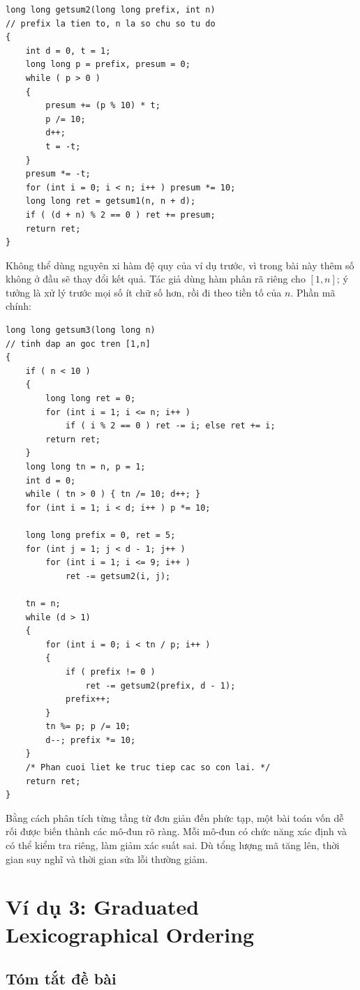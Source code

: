 \documentclass[11pt]{article}
\begin{document}
\begin{verbatim}
long long getsum2(long long prefix, int n)
// prefix la tien to, n la so chu so tu do
{
    int d = 0, t = 1;
    long long p = prefix, presum = 0;
    while ( p > 0 )
    {
        presum += (p % 10) * t;
        p /= 10;
        d++;
        t = -t;
    }
    presum *= -t;
    for (int i = 0; i < n; i++ ) presum *= 10;
    long long ret = getsum1(n, n + d);
    if ( (d + n) % 2 == 0 ) ret += presum;
    return ret;
}
\end{verbatim}

Không thể dùng nguyên xi hàm đệ quy của ví dụ trước, vì trong bài này thêm số
không ở đầu sẽ thay đổi kết quả. Tác giả dùng hàm phân rã riêng cho \([1,n]\);
ý tưởng là xử lý trước mọi số ít chữ số hơn, rồi đi theo tiền tố của \(n\).
Phần mã chính:

\begin{verbatim}
long long getsum3(long long n)
// tinh dap an goc tren [1,n]
{
    if ( n < 10 )
    {
        long long ret = 0;
        for (int i = 1; i <= n; i++ )
            if ( i % 2 == 0 ) ret -= i; else ret += i;
        return ret;
    }
    long long tn = n, p = 1;
    int d = 0;
    while ( tn > 0 ) { tn /= 10; d++; }
    for (int i = 1; i < d; i++ ) p *= 10;

    long long prefix = 0, ret = 5;
    for (int j = 1; j < d - 1; j++ )
        for (int i = 1; i <= 9; i++ )
            ret -= getsum2(i, j);

    tn = n;
    while (d > 1)
    {
        for (int i = 0; i < tn / p; i++ )
        {
            if ( prefix != 0 )
                ret -= getsum2(prefix, d - 1);
            prefix++;
        }
        tn %= p; p /= 10;
        d--; prefix *= 10;
    }
    /* Phan cuoi liet ke truc tiep cac so con lai. */
    return ret;
}
\end{verbatim}

Bằng cách phân tích từng tầng từ đơn giản đến phức tạp, một bài toán vốn dễ
rối được biến thành các mô-đun rõ ràng. Mỗi mô-đun có chức năng xác định và có
thể kiểm tra riêng, làm giảm xác suất sai. Dù tổng lượng mã tăng lên, thời gian
suy nghĩ và thời gian sửa lỗi thường giảm.

\section{Ví dụ 3: Graduated Lexicographical Ordering}

\subsection*{Tóm tắt đề bài}
\end{document}
